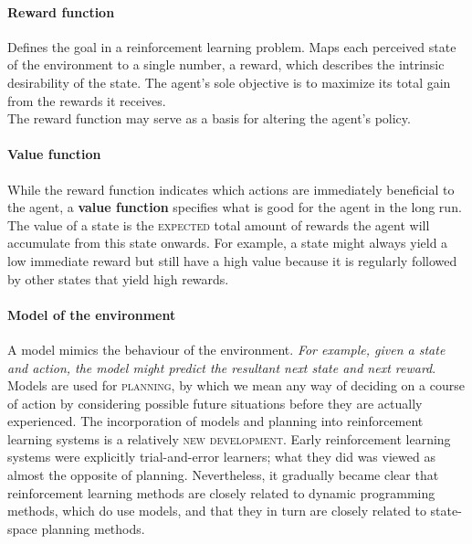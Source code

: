 \documentclass[11pt]{article}
\begin{document}
\paragraph{Reward function}
Defines the goal in a reinforcement learning problem. Maps each perceived state of the environment to a single number, a reward, which describes the intrinsic desirability of the state. The agent's sole objective is to maximize its total gain from the rewards it receives.\\
The reward function may serve as a basis for altering the agent's policy.

\paragraph{Value function}
While the reward function indicates which actions are immediately beneficial to the agent, a \textbf{value function} specifies what is good for the agent in the long run. The value of a state is the \textsc{expected} total amount of rewards the agent will accumulate from this state onwards.
For example, a state might always yield a low immediate reward but still have a high value because it is regularly followed by other states that yield high rewards.

\paragraph{Model of the environment}
A model mimics the behaviour of the environment. \textit{For example, given a state and action, the model might predict the resultant next state and next reward}. Models are used for \textsc{planning}, by which we mean any way of deciding on a course of action by considering possible future situations before they are actually experienced. The incorporation of models and planning into reinforcement learning systems is a relatively \textsc{new development}. Early reinforcement learning systems were explicitly trial-and-error learners; what they did was viewed as almost the opposite of planning. Nevertheless, it gradually became clear that reinforcement learning methods are closely related to dynamic programming methods, which do use models, and that they in turn are closely related to state-space planning methods. 

\end{document}
